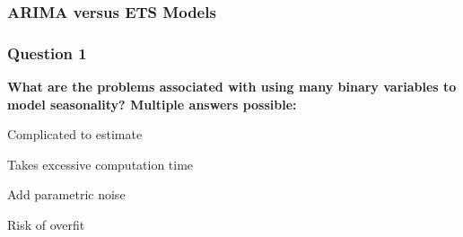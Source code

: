 \documentclass{beamer}
\newenvironment{wideenumerate}{\enumerate\addtolength{\itemsep}{10pt}}{\endenumerate}
\begin{document}
\begin{frame}
  \frametitle{ARIMA versus ETS Models}
\end{frame}



\begin{frame}
  \frametitle{Question 1}

\textbf{What are the problems associated with using many binary variables to model seasonality? Multiple answers possible:}\\

\bigskip

\begin{wideenumerate}
  \item Complicated to estimate
  \item Takes excessive computation time 
  \item Add parametric noise
  \item Risk of overfit
\end{wideenumerate}  
\end{frame}
\end{document}
